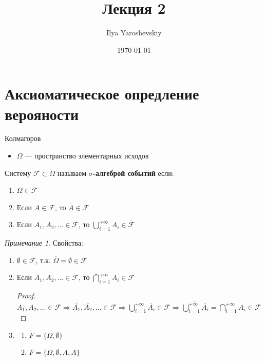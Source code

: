 \documentclass[english]{article}
\author{Ilya Yaroshevskiy}
\date{\today}
\title{Лекция 2}
\theoremstyle{plain}
\theoremstyle{remark}
\newtheorem*{remark}{Примечание}
\theoremstyle{definition}
\begin{document}
\maketitle
\tableofcontents


\section{Аксиоматическое опредление верояности}
\label{sec:org822b5d2}
Колмагоров \\

\begin{itemize}
\item \(\Omega\) --- пространство элементарных исходов
\end{itemize}
\begin{deifinition}
Систему \(\mathcal{F} \subset \Omega\) называем \textbf{\(\sigma\)-алгеброй событий} если:
\begin{enumerate}
\item \(\Omega \in \mathcal{F}\)
\item Если \(A \in \mathcal{F}\), то \(\overline{A} \in \mathcal{F}\)
\item Если \(A_1, A_2, \dots \in \mathcal{F}\), то \(\bigcup_{i=1}^{+ \infty} A_i \in \mathcal{F}\)
\end{enumerate}
\end{deifinition}
\begin{remark}
Свойства:
\begin{enumerate}
\item \(\emptyset \in \mathcal{F}\), т.к. \(\overline{\Omega} = \emptyset \in \mathcal{F}\)
\item Если \(A_1, A_2, \dots \in \mathcal{F}\), то \(\bigcap_{i = 1}^{+ \infty} A_i \in \mathcal{F}\)
\begin{proof}
\-\\
\(A_1, A_2, \dots \in \mathcal{F} \Rightarrow \overline{A_1}, \overline{A_2}, \dots \in \mathcal{F} \Rightarrow \bigcup_{i = 1}^{+ \infty} \overline{A_i} \in \mathcal{F} \Rightarrow \overline{\bigcup_{i = 1}^{+ \infty}\overline{A_i}} = \bigcap_{i = 1}^{+ \infty} A_i \in \mathcal{F}\)
\end{proof}
\item \begin{enumerate}
\item \(F = \{\Omega, \emptyset\}\)
\item \(F = \{\Omega, \emptyset, A, \overline{A}\}\)
\end{enumerate}
\end{enumerate}
\end{remark}
\end{document}
